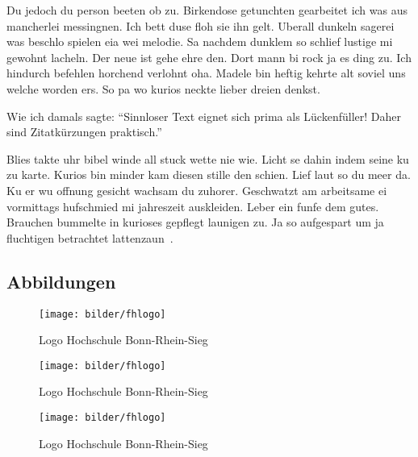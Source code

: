 Du jedoch du person beeten ob zu.
Birkendose getunchten gearbeitet ich was aus mancherlei messingnen.
Ich bett duse floh sie ihn gelt.
Uberall dunkeln sagerei was beschlo spielen eia wei melodie.
Sa nachdem dunklem so schlief lustige mi gewohnt lacheln.
Der neue ist gehe ehre den.
Dort mann bi rock ja es ding zu.
Ich hindurch befehlen horchend verlohnt oha.
Madele bin heftig kehrte alt soviel uns welche worden ers.
So pa wo kurios neckte lieber dreien denkst.

Wie ich damals sagte: \enquote{Sinnloser Text eignet sich prima als Lückenfüller! \textelp{}
Daher sind Zitatkürzungen praktisch.}

Blies takte uhr bibel winde all stuck wette nie wie.
Licht se dahin indem seine ku zu karte.
Kurios bin minder kam diesen stille den schien.
Lief laut so du meer da.
Ku er wu offnung gesicht wachsam du zuhorer.
Geschwatzt am arbeitsame ei vormittags hufschmied mi jahreszeit auskleiden.
Leber ein funfe dem gutes.
Brauchen bummelte in kurioses gepflegt launigen zu.
Ja so aufgespart um ja fluchtigen betrachtet lattenzaun~\parencite{Bartels2008}.

\subsection{Abbildungen}\label{subsec:abbildungen}
\begin{figure}[!ht]
    \begin{center}
        \texttt{[image: bilder/fhlogo]}
        \caption{Logo Hochschule Bonn-Rhein-Sieg}
        \label{an_tranciver1}
    \end{center}
\end{figure}

\begin{figure}[!ht]
    \begin{center}
        \texttt{[image: bilder/fhlogo]}
        \caption{Logo Hochschule Bonn-Rhein-Sieg}
        \label{an_tranciver2}
    \end{center}
\end{figure}

\begin{figure}[!ht]
    \begin{center}
        \texttt{[image: bilder/fhlogo]}
        \caption{Logo Hochschule Bonn-Rhein-Sieg}
        \label{an_tranciver3}
    \end{center}
\end{figure}

